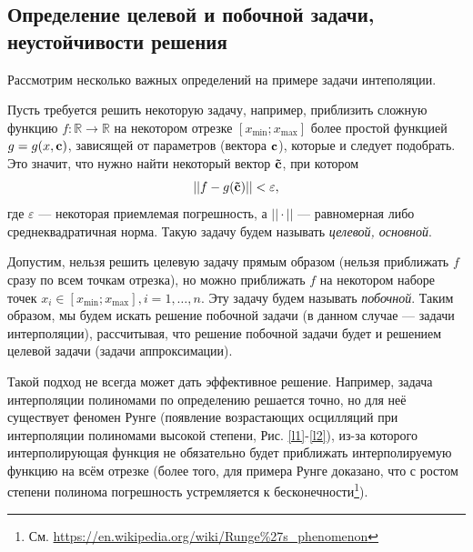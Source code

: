 \documentclass[a4paper, 12pt]{article}
\begin{document}
\FloatBarrier 
\subsection{Определение целевой и побочной задачи, неустойчивости решения}
Рассмотрим несколько важных определений на примере задачи интеполяции.

Пусть требуется решить некоторую задачу, например, приблизить сложную функцию $f: \mathbb{R} \rightarrow \mathbb{R}$
на некотором отрезке $[x_{\min};x_{\max}]$ более простой функцией $g=g(x,{\bf c})$, зависящей от параметров (вектора ${\bf c}$), которые и следует подобрать.
Это значит, что нужно найти некоторый вектор ${\bf \tilde{c} }$, при котором
\begin{equation*}
  ||f-g({\bf \tilde{c}})|| < \varepsilon,
\end{equation*}
где $\varepsilon$ --- некоторая приемлемая погрешность, а $||\cdot||$ --- равномерная либо среднеквадратичная норма.
Такую задачу будем называть {\it целевой, основной}.

Допустим, нельзя решить целевую задачу прямым образом (нельзя приближать $f$ сразу по всем точкам отрезка), но можно приближать $f$ на некотором наборе точек $x_i \in [x_{\min};x_{\max}], i=1,\dots,n$.
Эту задачу будем называть {\it побочной}. Таким образом,
мы будем искать решение побочной задачи (в данном случае --- задачи интерполяции),
рассчитывая, что решение побочной задачи будет и решением целевой задачи (задачи аппроксимации).

Такой подход не всегда может дать эффективное решение. Например, задача интерполяции полиномами по определению решается точно,
но для неё существует феномен Рунге (появление возрастающих осцилляций при интерполяции полиномами высокой степени, Рис. \ref{l1}-\ref{l2}),
из-за которого интерполирующая функция не обязательно будет приближать интерполируемую функцию на всём отрезке
(более того, для примера Рунге доказано, что с ростом степени полинома погрешность устремляется к бесконечности\footnote{См. \url{https://en.wikipedia.org/wiki/Runge\%27s_phenomenon} }).
\end{document}
